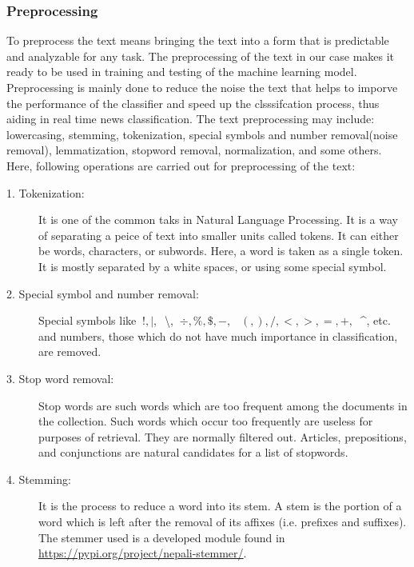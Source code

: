 \documentclass[12pt]{report}
\begin{document}
        \subsubsection{Preprocessing}
            To preprocess the text means bringing the text into a form that is predictable and analyzable for any task. The preprocessing of the text in our case
            makes it ready to be used in training and testing of the machine learning model. Preprocessing is mainly done to reduce the noise the text that 
            helps to imporve the performance of the classifier and speed up the clsssifcation process, thus aiding in real time news classification. The text preprocessing may 
            include: lowercasing, stemming, tokenization, special symbols and number removal(noise removal), lemmatization, stopword removal, normalization, and some others. 
            Here, following operations are carried out for preprocessing of the text:
            \begin{description}
                \item[1. Tokenization:]
                     It is one of the common taks in Natural Language Processing. It is a way of separating a peice of text into smaller units called tokens. 
                    It can either be words, characters, or subwords. Here, a word is taken as a single token. It is mostly separated by a white spaces, or using some special symbol.
                \item[2. Special symbol and number removal:] Special symbols like $~{!, |, }~$ \textbackslash, 
                $~{ \div, \%, \$, -,}~$ \newline $~{(, ), /, <, >, =, +,}~$  \textasciicircum, etc. and numbers, those which do not have much importance in classification, are removed.

                \item [3. Stop word removal:] Stop words are such words which are too frequent among the documents in the collection. Such words 
                    which occur too frequently are useless for purposes of retrieval. They are normally filtered out. Articles, prepositions, and conjunctions
                    are natural candidates for a list of stopwords.
                \item [4. Stemming:] It is the process to reduce a word into its stem. A stem is the portion of a word which is left after the removal 
                    of its affixes (i.e. prefixes and suffixes). The stemmer used is a developed module found in \url{https://pypi.org/project/nepali-stemmer/}.
                
            \end{description}
\end{document}
